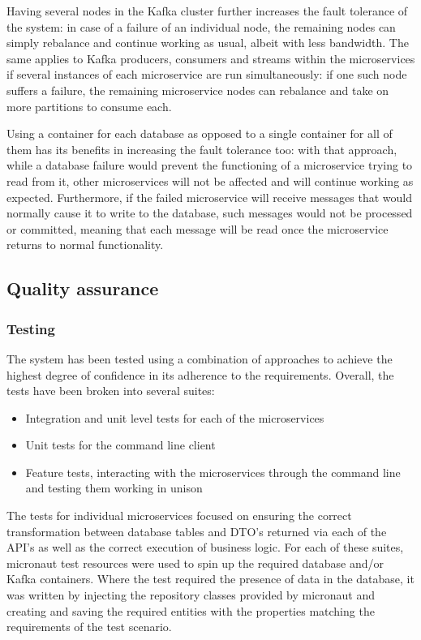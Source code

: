 \documentclass[parskip=full]{article}
\begin{document}
    Having several nodes in the Kafka cluster further increases the fault tolerance of the system: in case of a failure of an individual node, the remaining nodes can simply rebalance and continue working as usual, albeit with less bandwidth.
    The same applies to Kafka producers, consumers and streams within the microservices if several instances of each microservice are run simultaneously: if one such node suffers a failure, the remaining microservice nodes can rebalance and take on more partitions to consume each.

    Using a container for each database as opposed to a single container for all of them has its benefits in increasing the fault tolerance too: with that approach, while a database failure would prevent the functioning of a microservice trying to read from it, other microservices will not be affected and will continue working as expected.
    Furthermore, if the failed microservice will receive messages that would normally cause it to write to the database, such messages would not be processed or committed, meaning that each message will be read once the microservice returns to normal functionality.

    \pagebreak
    \subsection{Quality assurance}
    \subsubsection{Testing}
    The system has been tested using a combination of approaches to achieve the highest degree of confidence in its adherence to the requirements.
    Overall, the tests have been broken into several suites:
    \begin{itemize}
        \item Integration and unit level tests for each of the microservices
        \item Unit tests for the command line client
        \item Feature tests, interacting with the microservices through the command line and testing them working in unison
    \end{itemize}
    The tests for individual microservices focused on ensuring the correct transformation between database tables and DTO's returned via each of the API's as well as the correct execution of business logic.
    For each of these suites, micronaut test resources were used to spin up the required database and/or Kafka containers.
    Where the test required the presence of data in the database, it  was written by injecting the repository classes provided by micronaut and creating and saving the required entities with the properties matching the requirements of the test scenario.
\end{document}
